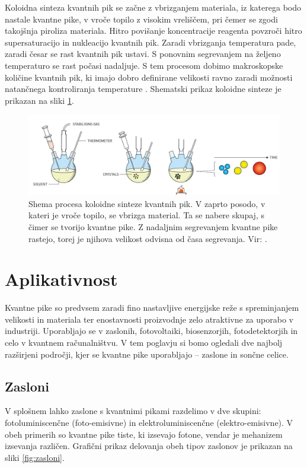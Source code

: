 \documentclass[twoside,11pt]{article}
\begin{document}
Koloidna sinteza kvantnih pik se začne z vbrizganjem materiala, iz katerega bodo nastale kvantne pike, v vroče topilo z visokim vreliščem, pri čemer
se zgodi takojšnja piroliza materiala. Hitro povišanje koncentracije reagenta povzroči hitro supersaturacijo in nukleacijo kvantnih pik. Zaradi vbrizganja temperatura pade,
zaradi česar se rast kvantnih pik ustavi. S ponovnim segrevanjem na željeno temperaturo se rast počasi nadaljuje. S tem procesom dobimo makroskopske količine
kvantnih pik, ki imajo dobro definirane velikosti ravno zaradi možnosti natančnega kontroliranja temperature \cite{nobel}. Shematski prikaz koloidne sinteze je prikazan na sliki \ref{fig:koloidna_sinteza}.

\begin{figure}[H]
   \begin{center}
       \includegraphics[width=16cm]{figures/koloidna_sinteza.png}
       \caption{Shema procesa koloidne sinteze kvantnih pik. V zaprto posodo, v kateri je vroče topilo, se vbrizga material. Ta se nabere skupaj, s čimer se tvorijo kvantne pike. Z nadaljnim segrevanjem kvantne pike rastejo, torej je njihova velikost odvisna od časa segrevanja. Vir: \cite{nobel2}.}
       \label{fig:koloidna_sinteza}
   \end{center}
\end{figure}

\section{Aplikativnost}
Kvantne pike so predvsem zaradi fino nastavljive energijske reže s spreminjanjem velikosti in materiala ter enostavnosti proizvodnje zelo atraktivne za uporabo v industriji. Uporabljajo se v zaslonih, fotovoltaiki, biosenzorjih, fotodetektorjih in celo v kvantnem računalništvu.
V tem poglavju si bomo ogledali dve najbolj razširjeni področji, kjer se kvantne pike uporabljajo -- zaslone in sončne celice.

\subsection{Zasloni}
V splošnem lahko zaslone s kvantnimi pikami razdelimo v dve skupini: fotoluminiscenčne (foto-emisivne) in elektroluminiscenčne (elektro-emisivne). 
V obeh primerih so kvantne pike tiste, ki izsevajo fotone, vendar je mehanizem izsevanja različen. Grafični prikaz delovanja obeh tipov zaslonov
je prikazan na sliki \ref{fig:zasloni}.
\end{document}
